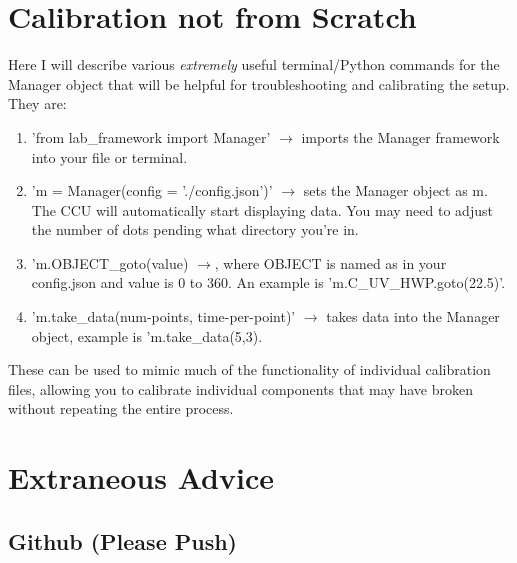 \documentclass{paper}[11pt]
\begin{document}
\section{Calibration not from Scratch}
Here I will describe various \textit{extremely} useful terminal/Python commands for the Manager object that will be helpful for troubleshooting and calibrating the setup. They are:
\begin{enumerate}
    \item 'from lab\_framework import Manager' $\rightarrow$ imports the Manager framework into your file or terminal.
    \item 'm = Manager(config = './config.json')' $\rightarrow$ sets the Manager object as m. The CCU will automatically start displaying data. You may need to adjust the number of dots pending what directory you're in.  
    \item 'm.OBJECT\_goto(value) $\rightarrow$, where OBJECT is named as in your config.json and value is 0 to 360. An example is 'm.C\_UV\_HWP.goto(22.5)'.
    \item 'm.take\_data(num-points, time-per-point)' $\rightarrow$ takes data into the Manager object, example is 'm.take\_data(5,3).
\end{enumerate}
These can be used to mimic much of the functionality of individual calibration files, allowing you to calibrate individual components that may have broken without repeating the entire process. 
\section{Extraneous Advice}
\subsection{Github (Please Push)}
\end{document}
